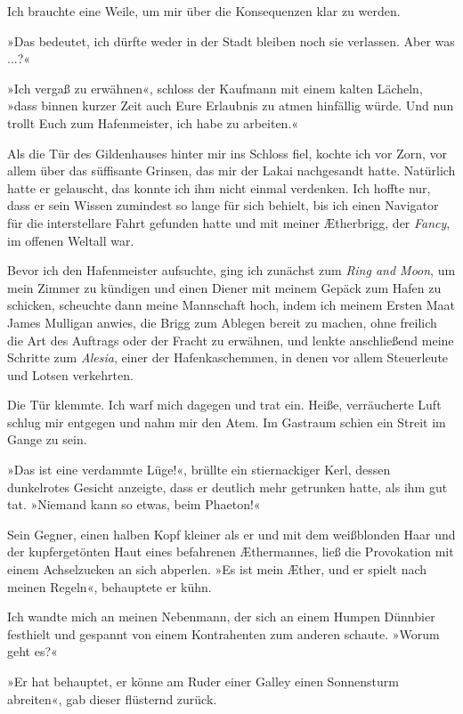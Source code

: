 Ich brauchte eine Weile, um mir über die Konsequenzen klar zu
werden.

»Das bedeutet, ich dürfte weder in der Stadt bleiben noch sie
verlassen. Aber was ...?«

»Ich vergaß zu erwähnen«, schloss der Kaufmann mit einem kalten
Lächeln, »dass binnen kurzer Zeit auch Eure Erlaubnis zu atmen
hinfällig würde. Und nun trollt Euch zum Hafenmeister, ich habe zu
arbeiten.«

\bigpar

Als die Tür des Gildenhauses hinter mir ins Schloss fiel, kochte
ich vor Zorn, vor allem über das süffisante Grinsen, das mir der
Lakai nachgesandt hatte. Natürlich hatte er gelauscht, das konnte
ich ihm nicht einmal verdenken. Ich hoffte nur, dass er sein Wissen
zumindest so lange für sich behielt, bis ich einen Navigator für
die interstellare Fahrt gefunden hatte und mit meiner Ætherbrigg,
der \emph{Fancy}, im offenen Weltall war.

Bevor ich den Hafenmeister aufsuchte, ging ich zunächst zum
\emph{Ring and Moon}, um mein Zimmer zu kündigen und einen Diener
mit meinem Gepäck zum Hafen zu schicken, scheuchte dann meine
Mannschaft hoch, indem ich meinem Ersten Maat James Mulligan
anwies, die Brigg zum Ablegen bereit zu machen, ohne freilich die
Art des Auftrags oder der Fracht zu erwähnen, und lenkte
anschließend meine Schritte zum \emph{Alesia}, einer der
Hafenkaschemmen, in denen vor allem Steuerleute und Lotsen
verkehrten.

Die Tür klemmte. Ich warf mich dagegen und trat ein. Heiße,
verräucherte Luft schlug mir entgegen und nahm mir den Atem. Im
Gastraum schien ein Streit im Gange zu sein.

»Das ist eine verdammte Lüge!«, brüllte ein stiernackiger Kerl,
dessen dunkelrotes Gesicht anzeigte, dass er deutlich mehr
getrunken hatte, als ihm gut tat. »Niemand kann so etwas, beim
Phaeton!«

Sein Gegner, einen halben Kopf kleiner als er und mit dem
weißblonden Haar und der kupfergetönten Haut eines befahrenen
Æthermannes, ließ die Provokation mit einem Achselzucken an sich
abperlen. »Es ist mein Æther, und er spielt nach meinen Regeln«,
behauptete er kühn.

Ich wandte mich an meinen Nebenmann, der sich an einem Humpen
Dünnbier festhielt und gespannt von einem Kontrahenten zum anderen
schaute. »Worum geht es?«

»Er hat behauptet, er könne am Ruder einer Galley einen Sonnensturm
abreiten«, gab dieser flüsternd zurück.


